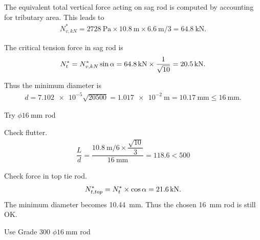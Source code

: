 \begin{solution}
The equivalent total vertical force acting on sag rod is computed by accounting for tributary area. This leads to
\begin{gather*}
N^*_{v,kN}=\SI{2728}{\pascal}\times\SI{10.8}{\meter}\times\SI{6.6}{\meter}/3=\SI{64.8}{\kilo\newton}.
\end{gather*}

The critical tension force in sag rod is
\begin{gather*}
N^*_t=N^*_{v,kN}\sin\alpha=\SI{64.8}{\kilo\newton}\times\dfrac{1}{\sqrt{10}}=\SI{20.5}{\kilo\newton}.
\end{gather*}
\begin{figure}[H]
\centering\footnotesize
{}
\end{figure}

Thus the minimum diameter is
\begin{gather*}
d=\num{7.102e-5}\sqrt{20500}=\SI{1.017e-2}{\meter}=\SI{10.17}{\mm}\le\SI{16}{\mm}.
\end{gather*}
\begin{flushright}
Try $\phi\SI{16}{\mm}$ rod
\end{flushright}

Check flutter.
\begin{gather}
\dfrac{L}{d}=\dfrac{\SI{10.8}{\meter}/6\times\dfrac{\sqrt{10}}{3}}{\SI{16}{\mm}}=118.6<500
\end{gather}

Check force in top tie rod.
\begin{gather*}
N^*_{t,top}=N^*_t\times\cos\alpha=\SI{21.6}{\kilo\newton}.
\end{gather*}
The minimum diameter becomes \SI{10.44}{\mm}. Thus the chosen \SI{16}{\mm} rod is still OK.
\begin{figure}[H]
\centering\footnotesize
{}
\end{figure}
\begin{flushright}
Use Grade 300 $\phi\SI{16}{\mm}$ rod
\end{flushright}
\end{solution}